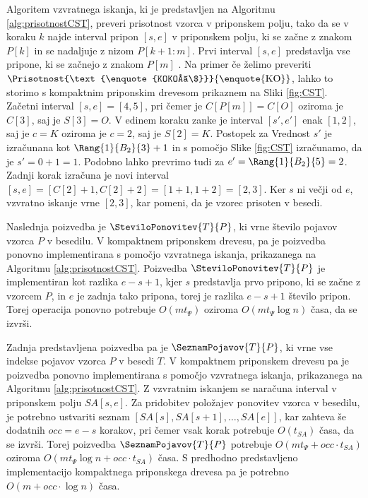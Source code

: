 Algoritem vzvratnega iskanja, ki je predstavljen na Algoritmu \ref{alg:prisotnostCST}, preveri prisotnost vzorca v priponskem polju, tako da se v koraku $k$ najde interval pripon $[s,e]$ v priponskem polju, ki se začne z znakom $P[k]$ in se nadaljuje z nizom $P[k+1:m]$. Prvi interval $[s,e]$ predstavlja vse pripone, ki se začnejo z znakom $P[m]$ \cite{Navarro2016}. Na primer če želimo preveriti $\Prisotnost{\text{\enquote{KOKOŠ\$}}}{\text{\enquote{KO}}}$, lahko to storimo s kompaktnim priponskim drevesom prikaznem na Sliki \ref{fig:CST}. Začetni interval $[s,e]=[4,5]$, pri čemer je $C[P[m]]=C[O]$ oziroma je $C[3]$, saj je $S[3]=O$. V edinem koraku zanke je interval $[s',e']$ enak $[1,2]$, saj je $c=K$ oziroma je $c=2$, saj je $S[2]=K$. Postopek za Vrednost $s'$ je izračunana kot $\Rang{1}{B_2}{3}+1$ in s pomočjo Slike \ref{fig:CST} izračunamo, da je $s'=0+1=1$. Podobno lahko prevrimo tudi za $e'=\Rang{1}{B_2}{5}=2$. Zadnji korak izračuna je novi interval $[s,e]=[C[2]+1,C[2]+2]=[1+1,1+2]=[2,3]$. Ker $s$ ni večji od $e$, vzvratno iskanje vrne $[2,3]$, kar pomeni, da je vzorec prisoten v besedi.

Naslednja poizvedba je $\SteviloPonovitev{T}{P}$, ki vrne število pojavov vzorca $P$ v besedilu. V kompaktnem priponskem drevesu, pa je poizvedba ponovno implementirana s pomočjo vzvratnega iskanja, prikazanega na Algoritmu \ref{alg:prisotnostCST}. Poizvedba $\SteviloPonovitev{T}{P}$ je implementiran kot razlika $e-s+1$, kjer $s$ predstavlja prvo pripono, ki se začne z vzorcem $P$, in $e$ je zadnja tako pripona, torej je razlika $e-s+1$ število pripon. Torej operacija ponovno potrebuje $O(mt_\Psi)$ oziroma $O(mt_\Psi\log{n})$ časa, da se izvrši.

Zadnja predstavljena poizvedba pa je $\SeznamPojavov{T}{P}$, ki vrne vse indekse pojavov vzorca $P$ v besedi $T$. V kompaktnem priponskem drevesu pa je poizvedba ponovno implementirana s pomočjo vzvratnega iskanja, prikazanega na Algoritmu \ref{alg:prisotnostCST}. Z vzvratnim iskanjem se naračuna interval v priponskem polju $SA[s,e]$. Za pridobitev položajev ponovitev vzorca v besedilu, je potrebno ustvariti seznam $[SA[s],SA[s+1],\dots,SA[e]]$, kar zahteva še dodatnih $occ=e-s$ korakov, pri čemer vsak korak potrebuje $O(t_{SA})$ časa, da se izvrši. Torej poizvedba $\SeznamPojavov{T}{P}$ potrebuje $O(mt_\Psi+occ\cdot t_{SA})$ oziroma $O(mt_\Psi \log{n}+occ\cdot t_{SA})$ časa. S predhodno predstavljeno implementacijo kompaktnega priponskega drevesa pa je potrebno $O(m+occ\cdot\log{n})$ časa.

